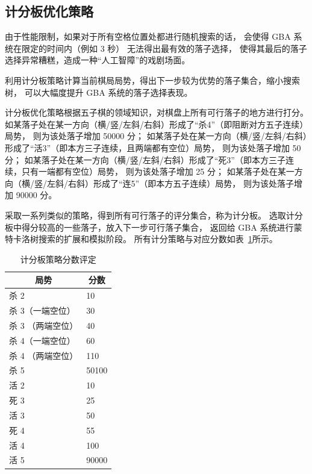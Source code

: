 \documentclass[UTF8,cs4size]{ctexart}
\begin{document}
\subsection{计分板优化策略}
由于性能限制，如果对于所有空格位置处都进行随机搜索的话，
会使得 GBA 系统在限定的时间内（例如 3 秒） 无法得出最有效的落子选择，
使得其最后的落子选择异常糟糕，造成一种“人工智障”的戏剧场面。

利用计分板策略计算当前棋局局势，得出下一步较为优势的落子集合，缩小搜索树，
可以大幅度提升 GBA 系统的落子选择表现。

计分板优化策略根据五子棋的领域知识，对棋盘上所有可行落子的地方进行打分。
如某落子处在某一方向（横/竖/左斜/右斜）形成了“杀4”（即阻断对方五子连续）局势，
则为该处落子增加 50000 分；
如某落子处在某一方向（横/竖/左斜/右斜）形成了“活3”（即本方三子连续，且两端都有空位）局势，
则为该处落子增加 50 分；
如某落子处在某一方向（横/竖/左斜/右斜）形成了“死3”（即本方三子连续，只有一端都有空位）局势，
则为该处落子增加 25 分；
如某落子处在某一方向（横/竖/左斜/右斜）形成了“连5”（即本方五子连续）局势，
则为该处落子增加 90000 分。

采取一系列类似的策略，得到所有可行落子的评分集合，称为计分板。
选取计分板中得分较高的一些落子，放入下一步可行落子集合，
返回给 GBA 系统进行蒙特卡洛树搜索的扩展和模拟阶段。
所有计分策略与对应分数如表~\ref{tab:score_board}所示。

\begin{table}[htbp]
  \caption{计分板策略分数评定}
  \label{tab:score_board}
  \centering
  \begin{tabular}[c]{l|l}
    \hline
    \multicolumn{1}{c|}{\textbf{局势}} & 
    \multicolumn{1}{c}{\textbf{分数}} \\
    \hline
	  杀 2 & 10 \\
	  杀 3（一端空位）& 30 \\
	  杀 3 （两端空位）& 40 \\
	  杀 4（一端空位）& 60 \\
	  杀 4 （两端空位）& 110 \\
	  杀 5 & 50100 \\
	  活 2 & 10 \\
	  死 3 & 25 \\
	  活 3 & 50 \\
	  死 4 & 55 \\
	  活 4 & 100 \\
	  活 5 & 90000 \\
   \hline
  \end{tabular}
\end{table}
\end{document}
